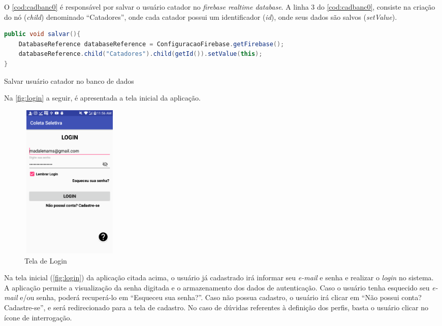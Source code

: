 O \autoref{cod:cadbanc0} é responsável por salvar o usuário catador no \textit{firebase realtime database}. A linha 3 do \autoref{cod:cadbanc0}, consiste na criação do nó (\textit{child}) denominado “Catadores”, onde cada catador possui um identificador (\textit{id}), onde seus dados são salvos (\textit{setValue}).

\begin{codigo}[H]
\begin{lstlisting}[language=Java]
public void salvar(){
    DatabaseReference databaseReference = ConfiguracaoFirebase.getFirebase();
    databaseReference.child("Catadores").child(getId()).setValue(this);
}
\end{lstlisting}
\caption{Salvar usuário catador no banco de dados}
\label{cod:cadbanc0}
\end{codigo}


Na \autoref{fig:login} a seguir, é apresentada a tela inicial da aplicação. 

\begin{figure}[H]
	\begin{Center}
		\includegraphics[width=1.85in,height=2.94in]{./media/image34.png}
	\end{Center}
\caption{Tela de Login}
\label{fig:login}
\end{figure}
Na tela inicial (\autoref{fig:login}) da aplicação citada acima, o usuário já cadastrado irá informar seu \textit{e-mail} e senha e realizar o \textit{login} no sistema. A aplicação permite a visualização da senha digitada e o armazenamento dos dados de autenticação. Caso o usuário tenha esquecido seu \textit{e-mail} e/ou senha, poderá recuperá-lo em “Esqueceu sua senha?”. Caso não possua cadastro, o usuário irá clicar em “Não possui conta? Cadastre-se”, e será redirecionado para a tela de cadastro. No caso de dúvidas referentes à definição dos perfis, basta o usuário clicar no ícone de interrogação.

